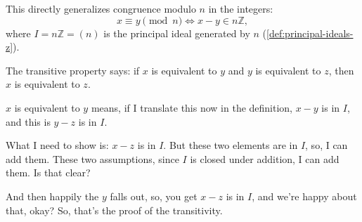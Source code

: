 \begin{content}

\begin{steps}
This directly generalizes congruence modulo $n$ in the integers:
\[
x \equiv y \pmod n \iff x - y \in n\mathbb{Z},
\]
where $I = n\mathbb{Z} = (n)$ is the principal ideal generated by $n$ (\cref{def:principal-ideals-z}).
\end{steps}
\end{content}

\begin{speech}[00:31:57 - 00:33:28]
 The transitive property says: if $x$ is equivalent to $y$ and $y$ is equivalent to $z$, then $x$ is equivalent to $z$.  

$x$ is equivalent to $y$ means, if I translate this now in the definition, $x - y$ is in $I$,  and this is $y - z$ is in $I$.  

What I need to show is: $x - z$ is in $I$. But these two elements are in $I$, so, I can add them.  These two assumptions, since $I$ is closed under addition, I can add them. Is that clear? 

And then happily the $y$ falls out, so, you get $x - z$ is in $I$,  and we're happy about that, okay? So, that's the proof of the transitivity.
\end{speech}

